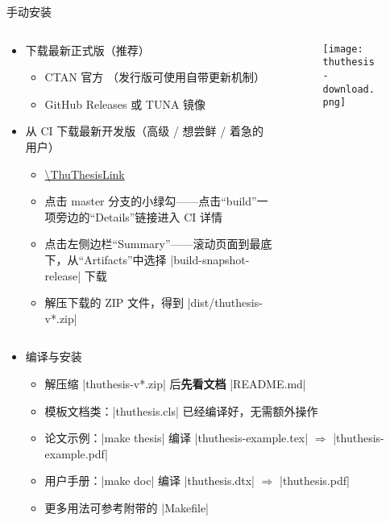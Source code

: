 \begin{frame}[fragile]{手动安装\ThuThesis{}}
      \begin{columns}
        \begin{column}{.75\textwidth}
  \begin{itemize}
    \item 下载最新正式版（推荐）
      \begin{itemize}
        \item CTAN 官方 （发行版可使用自带更新机制）
        \item GitHub Releases  或 TUNA 镜像 
      \end{itemize}
    \item 从 CI 下载最新开发版（高级 / 想尝鲜 / 着急的用户）
      \begin{itemize}
        \item \url{\ThuThesisLink}
        \item 点击 master 分支的小绿勾——点击“build”一项旁边的“Details”链接进入 CI 详情
        \item 点击左侧边栏“Summary”——滚动页面到最底下，从“Artifacts”中选择 |build-snapshot-release| 下载
        \item 解压下载的 ZIP 文件，得到 |dist/thuthesis-v*.zip|
      \end{itemize}
  \end{itemize}
        \end{column}
        \begin{column}{.25\textwidth}
          \begin{figure}[htbp]
            \centering
            \texttt{[image: thuthesis-download.png]}
          \end{figure}
        \end{column}
      \end{columns}
  \begin{itemize}
    \item 编译与安装
      \begin{itemize}
        \item 解压缩 |thuthesis-v*.zip| 后\textbf{先看文档} |README.md|
        \item 模板文档类：|thuthesis.cls| 已经编译好，无需额外操作
        \item 论文示例：|make thesis| 编译 |thuthesis-example.tex| $\Rightarrow$
        |thuthesis-example.pdf|
        \item 用户手册：|make doc| 编译 |thuthesis.dtx| $\Rightarrow$
          |thuthesis.pdf|
        \item 更多用法可参考附带的 |Makefile|
      \end{itemize}
  \end{itemize}
\end{frame}


